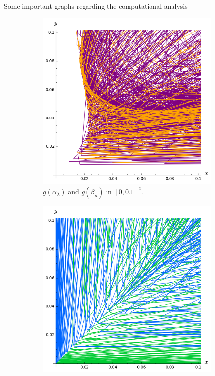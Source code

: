 \documentclass[final]{beamer}
\newlength{\twocolwid}
\begin{document}
\begin{frame}[t]
\begin{columns}[t]
\begin{column}{\twocolwid}
\begin{alertblock}{Some important graphs regarding the computational analysis}
\begin{center}
\begin{figure}
\begin{subfigure}{.28\linewidth}\centering
\includegraphics[width=1\textwidth]{plots/ch5_26_1curves4.png}
\vspace{-0.1cm}\caption{$g(\alpha_{\lambda})$ and $g(\beta_{\mu})$ in $[0, 0.1]^2$.}\label{curveg}
\end{subfigure}
\hspace{2cm}
\begin{subfigure}{.28\linewidth}\centering
\includegraphics[width=1\textwidth]{plots/ch5_32_4curves2.png}

\end{subfigure}
\end{figure}
\end{center}
\end{alertblock}
\end{column}
\end{columns}
\end{frame}
\end{document}
